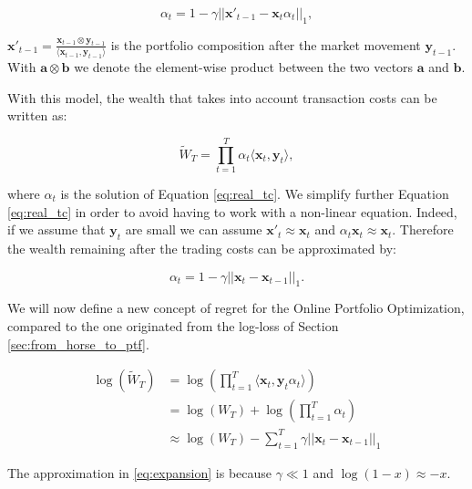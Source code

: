 \begin{equation}\label{eq:real_tc}
   \alpha_t = 1 - \gamma ||\mathbf{x}'_{t-1}-\mathbf{x}_t \alpha_{t} ||_1,
\end{equation}


$\mathbf{x'}_{t-1} = \frac{\mathbf{x}_{t-1} \otimes \mathbf{y}_{t-1} }{\langle \mathbf{x}_{t-1}, \mathbf{y}_{t-1} \rangle }$ is the portfolio composition after the market movement $\mathbf{y}_{t-1}$.  With $ \mathbf{a} \otimes \mathbf{b}$ we denote the element-wise product between the two vectors $\mathbf{a}$ and $\mathbf{b}$.

With this model, the wealth that takes into account transaction costs
can be written as:

\begin{equation} \label{eq:realwealth}
    \tilde W_T = \prod\limits_{t=1}^T \alpha_t\langle \mathbf{x}_t, \mathbf{y}_t \rangle,
\end{equation}

where $\alpha_t$ is the solution of Equation \eqref{eq:real_tc}. We simplify further Equation \eqref{eq:real_tc} in order to avoid having to work with a non-linear equation. Indeed, if we assume that $\mathbf y_t$ are small we can assume $\mathbf x'_t\approx \mathbf x_t$ and $\alpha_t\mathbf x_t\approx\mathbf x_t$. Therefore the wealth remaining after the trading costs can be approximated by:

\begin{equation}\label{eq:fake_tc}
\alpha_t=1-\gamma||\mathbf x_t-\mathbf x_{t-1}||_1.
\end{equation}

We will now define a new concept of regret for the Online Portfolio Optimization, compared to the one originated from the log-loss of Section \ref{sec:from_horse_to_ptf}. 

\begin{align}
    \log(\tilde W_T)&=\log\left(\prod\limits_{t=1}^T  \langle \mathbf{x}_t, \mathbf{y}_t \alpha_t\rangle\right) \\ 
    & = \log(W_T)+\log\left(\prod\limits_{t=1}^T \alpha_t\right) \\ 
    & \approx \log(W_T) - \sum\limits_{t=1}^T\gamma||\mathbf{x}_t-\mathbf{x}_{t-1}||_1 \label{eq:expansion}
\end{align}

The approximation in \eqref{eq:expansion} is because $\gamma\ll1$ and $\log(1-x)\approx-x$.


